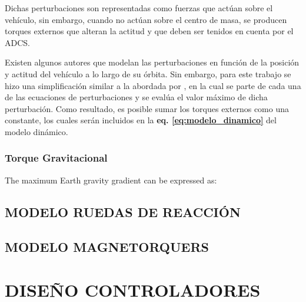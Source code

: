 Dichas perturbaciones son representadas como fuerzas que actúan sobre el vehículo, sin embargo, cuando no actúan sobre el centro de masa, se producen torques externos que alteran la actitud y que deben ser tenidos en cuenta por el ADCS.

Existen algunos autores \cite{zapf2006robust}\cite{Andresen2005} que modelan las perturbaciones en función de la posición y actitud del vehículo a lo largo de su órbita. Sin embargo, para este trabajo se hizo una simplificación similar a la abordada por \cite{tes:Sorolla2019}, en la cual se parte de cada una de las ecuaciones de perturbaciones y se evalúa el valor máximo de dicha perturbación. Como resultado, es posible sumar los torques externos como una constante, los cuales serán incluidos en la \textbf{eq. \ref{eq:modelo_dinamico}} del modelo dinámico.

\subsubsection{Torque Gravitacional}


The maximum Earth gravity gradient can be expressed as:



\subsection{MODELO RUEDAS DE REACCIÓN}


\subsection{MODELO MAGNETORQUERS}


\section{DISEÑO CONTROLADORES}
